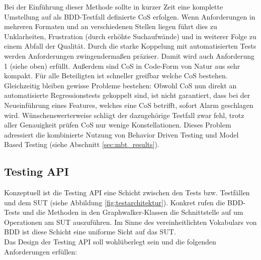 Bei der Einführung dieser Methode sollte in kurzer Zeit eine komplette Umstellung auf als BDD-Testfall definierte CoS erfolgen. Wenn Anforderungen in mehreren Formaten und an verschiedenen Stellen liegen führt dies zu Unklarheiten, Frustration (durch erhöhte Suchaufwände) und in weiterer Folge zu einem Abfall der Qualität. Durch die starke Koppelung mit automatisierten Tests werden Anforderungen zwingendermaßen präziser. Damit wird auch Anforderung 1 (siehe oben) erfüllt. Außerdem sind CoS in Code-Form von Natur aus sehr kompakt. Für alle Beteiligten ist schneller greifbar welche CoS bestehen.\\
Gleichzeitig bleiben gewisse Probleme bestehen: Obwohl CoS nun direkt an automatisierte Regressionstests gekoppelt sind, ist nicht garantiert, dass bei der Neueinführung eines Features, welches eine \Gls{CoS} betrifft, sofort Alarm geschlagen wird. Wünschenswerterweise schlägt der dazugehörige Testfall zwar fehl, trotz aller Genauigkeit prüfen \Gls{CoS} nur wenige Konstellationen. Dieses Problem adressiert die kombinierte Nutzung von Behavior Driven Testing und Model Based Testing (siehe Abschnitt \ref{sec:mbt_results}).

\subsection{Testing API}
\label{sec:testing_api}
Konzeptuell ist die Testing API eine Schicht zwischen den Tests bzw. Testfällen und dem \Gls{SUT} (siehe Abbildung \ref{fig:testarchitektur}). Konkret rufen die BDD-Tests und die Methoden in den Graphwalker-Klassen die Schnittstelle auf um Operationen am \Gls{SUT} auszuführen. Im Sinne des vereinheitlichten Vokabulars von BDD ist diese Schicht eine uniforme Sicht auf das SUT.\\
Das Design der Testing API soll wohlüberlegt sein und die folgenden Anforderungen erfüllen:

